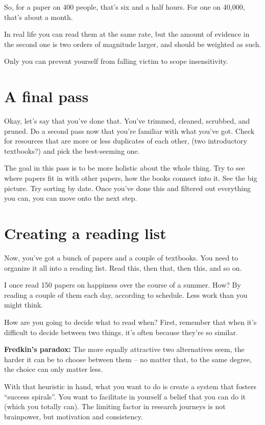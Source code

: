 So, for a paper on 400 people, that's six and a half hours. For one on 40,000,
that's about a month.

In real life you can read them at the same rate, but the amount of
evidence in the second one is two orders of magnitude larger, and should be
weighted as such.

Only you can prevent yourself from falling victim to scope insensitivity.


\section{A final pass}

Okay, let's say that you've done that. You've trimmed, cleaned, scrubbed, and
pruned. Do a second pass now that you're familiar with what you've got. Check for resources
that are more or less duplicates of each other,
(two introductory textbooks?) and pick the best-seeming one.

The goal in this pass is to be more holistic about the whole thing. Try to see
where papers fit in with other papers, how the books connect into it. See the
big picture. Try sorting by
date. Once you've done this and filtered out everything you can, you can move
onto the next step.

\section{Creating a reading list}

Now, you've got a bunch of papers and a couple of textbooks. You need to
organize it all into a reading list. Read this, then that, then this, and so on.

I once read 150 papers on happiness over the course of a summer. How? By reading
a couple of them each day, according to schedule. Less work than you might
think.

 How are you going to decide what to read when? First, remember that
when it's difficult to decide between two things, it's often because they're
so similar.

\textbf{Fredkin's paradox:} The more equally attractive two alternatives seem,
the harder it can be to choose between them -- no matter that, to the same
degree, the choice can only matter less.

With that heuristic in hand, what you want to do is create a system that fosters ``success spirals''. You want to facilitate in yourself a belief that you can do it (which
you totally can). The limiting factor in research journeys is not brainpower, but motivation and consistency.

